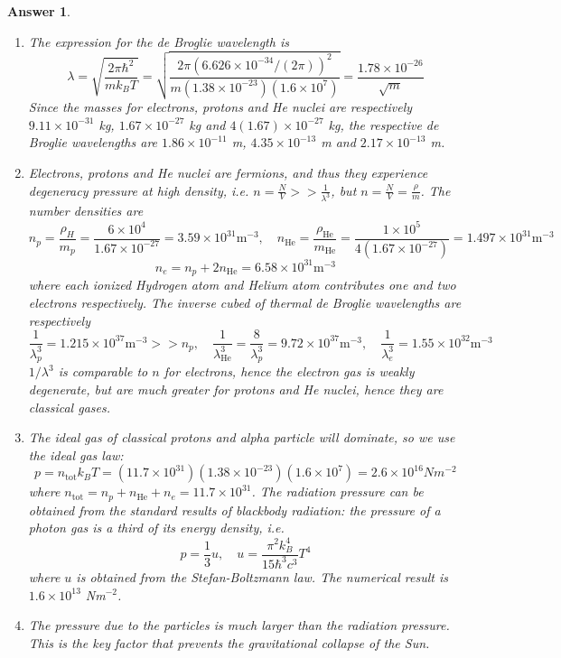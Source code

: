 \documentclass[a4paper]{article}
\theoremstyle{new2}
\newtheorem{ans}{Answer}[section]
\theoremstyle{new}
\begin{document}
\begin{ans}\leavevmode
\begin{enumerate}[label=(\alph*)]
\item The expression for the de Broglie wavelength is
$$\lambda=\sqrt{\frac{2\pi\hbar^2}{mk_BT}}=\sqrt{\frac{2\pi(6.626\times10^{-34}/(2\pi))^2}{m(1.38\times10^{-23})(1.6\times10^7)}}=\frac{1.78\times10^{-26}}{\sqrt{m}}$$
Since the masses for electrons, protons and He nuclei are respectively $9.11\times10^{-31}$ kg, $1.67\times10^{-27}$ kg and $4(1.67)\times10^{-27}$ kg, the respective de Broglie wavelengths are $1.86\times10^{-11}$ m, $4.35\times10^{-13}$ m and $2.17\times10^{-13}$ m.
\item Electrons, protons and He nuclei are fermions, and thus they experience degeneracy pressure at high density, i.e. $n=\frac{N}{V}>>\frac{1}{\lambda^3}$, but $n=\frac{N}{V}=\frac{\rho}{m}$. The number densities are
$$n_p=\frac{\rho_H}{m_p}=\frac{6\times10^4}{1.67\times10^{-27}}=3.59\times10^{31}\text{m}^{-3},\quad n_{\text{He}}=\frac{\rho_{\text{He}}}{m_{\text{He}}}=\frac{1\times10^5}{4(1.67\times10^{-27})}=1.497\times10^{31}\text{m}^{-3}$$
$$n_e=n_p+2n_{\text{He}}=6.58\times10^{31}\text{m}^{-3}$$
where each ionized Hydrogen atom and Helium atom contributes one and two electrons respectively. The inverse cubed of thermal de Broglie wavelengths are respectively
$$\frac{1}{\lambda^3_p}=1.215\times10^{37}\text{m}^{-3}>>n_p,\quad\frac{1}{\lambda^3_{\text{He}}}=\frac{8}{\lambda^3_p}=9.72\times10^{37}\text{m}^{-3},\quad\frac{1}{\lambda_e^3}=1.55\times10^{32}\text{m}^{-3}$$
$1/\lambda^3$ is comparable to $n$ for electrons, hence the electron gas is weakly degenerate, but are much greater for protons and He nuclei, hence they are classical gases.
\item The ideal gas of classical protons and alpha particle will dominate, so we use the ideal gas law:
$$p=n_{\text{tot}}k_BT=(11.7\times10^{31})(1.38\times10^{-23})(1.6\times10^7)=2.6\times10^{16}Nm^{-2}$$
where $n_{\text{tot}}=n_p+n_{\text{He}}+n_e=11.7\times10^{31}$. The radiation pressure can be obtained from the standard results of blackbody radiation: the pressure of a photon gas is a third of its energy density, i.e.
$$p=\frac{1}{3}u,\quad u=\frac{\pi^2k_B^4}{15\hbar^3c^3}T^4$$
where $u$ is obtained from the Stefan-Boltzmann law. The numerical result is $1.6\times10^{13}$ Nm$^{-2}$.
\item The pressure due to the particles is much larger than the radiation pressure. This is the key factor that prevents the gravitational collapse of the Sun.
\end{enumerate}
\end{ans}
\end{document}
